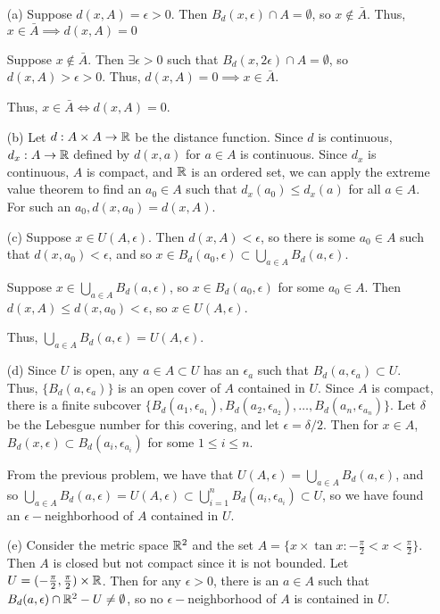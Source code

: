 \documentclass{hmwk}
\begin{document}
\begin{solution}
\begin{itemize}
    \item[(a)] Suppose $d(x, A) = \epsilon > 0$. Then $B_d(x, \epsilon) \cap A = \emptyset$, so $x \notin \bar{A}$. Thus, $x \in \bar{A} \implies d(x, A) = 0$

    \pre Suppose $x \notin \bar{A}$. Then $\exists \epsilon > 0$ such that $B_d(x, 2\epsilon) \cap A = \emptyset$, so $d(x, A) > \epsilon > 0$. Thus, $d(x, A) = 0 \implies x \in \bar{A}$.

    \pre Thus, $x \in \bar{A} \iff d(x, A) = 0$.
    
    \item[(b)] Let $d: A \times A \rightarrow \mathbb{R}$ be the distance function. Since $d$ is continuous, $d_x: A \rightarrow \mathbb{R}$ defined by $d(x, a)$ for $a \in A$ is continuous. Since $d_x$ is continuous, $A$ is compact, and $\mathbb{R}$ is an ordered set, we can apply the extreme value theorem to find an $a_0 \in A$ such that $d_x(a_0) \leq d_x(a)$ for all $a \in A$. For such an $a_0, d(x, a_0) = d(x, A)$.
    
    \item[(c)] Suppose $x \in U(A, \epsilon)$. Then $d(x, A) < \epsilon$, so there is some $a_0 \in A$ such that $d(x, a_0) < \epsilon$, and so $x \in B_d(a_0, \epsilon) \subset \bigcup_{a \in A}B_d(a, \epsilon)$. 

    \pre Suppose $x \in \bigcup_{a \in A}B_d(a, \epsilon)$, so $x \in B_d(a_0, \epsilon)$ for some $a_0 \in A$. Then $d(x, A) \leq d(x, a_0) < \epsilon$, so $x \in U(A, \epsilon)$.

    \pre Thus, $\bigcup_{a \in A}B_d(a, \epsilon) = U(A, \epsilon)$.
    
    \item[(d)] Since $U$ is open, any $a \in A \subset U$ has an $\epsilon_a$ such that $B_d(a, \epsilon_a) \subset U$. Thus, $\{B_d(a, \epsilon_a)\}$ is an open cover of $A$ contained in $U$. Since $A$ is compact, there is a finite subcover $\{B_d(a_1, \epsilon_{a_1}), B_d(a_2, \epsilon_{a_2}), \dots, B_d(a_n, \epsilon_{a_n})\}$. Let $\delta$ be the Lebesgue number for this covering, and let $\epsilon = \delta/2$. Then for $x \in A$, $B_d(x, \epsilon) \subset B_d(a_i, \epsilon_{a_i})$ for some $1 \leq i \leq n$. 

    \pre From the previous problem, we have that $U(A, \epsilon) = \bigcup_{a \in A}B_d(a, \epsilon)$, and so $\bigcup_{a \in A}B_d(a, \epsilon) = U(A, \epsilon) \subset \bigcup_{i = 1}^n B_d(a_i, \epsilon_{a_i}) \subset U$, so we have found an $\epsilon-$neighborhood of $A$ contained in $U$.
    
    \item[(e)] Consider the metric space $\mathbb{R}^2$ and the set $A = \{x \times \tan x : -\frac{\pi}{2} < x < \frac{\pi}{2}\}$. Then $A$ is closed but not compact since it is not bounded. Let $U = (-\frac{\pi}{2}, \frac{\pi}{2}) \times \mathbb{R}$. Then for any $\epsilon > 0$, there is an $a \in A$ such that $B_d(a, \epsilon) \cap \mathbb{R}^2 - U \neq \emptyset$, so no $\epsilon-$neighborhood of $A$ is contained in $U$. 
\end{itemize}
\end{solution}
\end{document}
